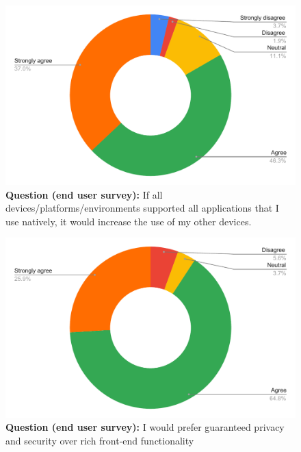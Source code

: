 \begin{figure}[H]
  \centering
  \includegraphics[width=13cm]{thesis/paper/images/p2u_q10.pdf}
  \textbf{Question (end user survey):} If all devices/platforms/environments supported all applications that I use natively, it would increase the use of my other devices.
\end{figure}

\begin{figure}[H]
  \centering
  \includegraphics[width=13cm]{thesis/paper/images/p2u_q11.pdf}
  \textbf{Question (end user survey):} I would prefer guaranteed privacy and security over rich front-end functionality
\end{figure}

